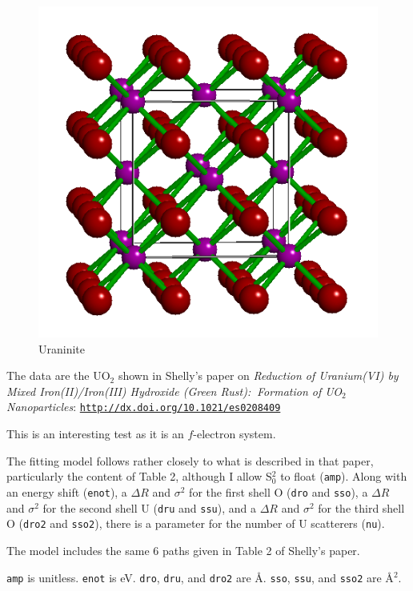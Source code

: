 \documentclass{article}
\begin{document}
\begin{figure}
  \includegraphics[width=\linewidth]{UO2/UO2.png}
  \caption{Uraninite}
\end{figure}
The data are the UO$_2$ shown in Shelly's paper on \textit{Reduction
  of Uranium(VI) by Mixed Iron(II)/Iron(III) Hydroxide (Green Rust): 
  Formation of UO$_2$ Nanoparticles}:
\href{http://dx.doi.org/10.1021/es0208409}{\texttt{http://dx.doi.org/10.1021/es0208409}}

This is an interesting test as it is an $f$-electron system.

The fitting model follows rather closely to what is described in that
paper, particularly the content of Table 2, although I allow S$_0^2$
to float (\texttt{amp}).  Along with an energy shift (\texttt{enot}),
a $\Delta R$ and $\sigma^2$ for the first shell O (\texttt{dro} and
\texttt{sso}), a $\Delta R$ and $\sigma^2$ for the second shell U
(\texttt{dru} and \texttt{ssu}), and a $\Delta R$ and $\sigma^2$ for
the third shell O (\texttt{dro2} and \texttt{sso2}), there is a
parameter for the number of U scatterers (\texttt{nu}).

The model includes the same 6 paths given in Table 2 of Shelly's
paper.

\texttt{amp} is unitless.  \texttt{enot} is eV.
\texttt{dro}, \texttt{dru}, and \texttt{dro2} are \AA.
\texttt{sso}, \texttt{ssu}, and \texttt{sso2} are \AA$^2$.
\end{document}
